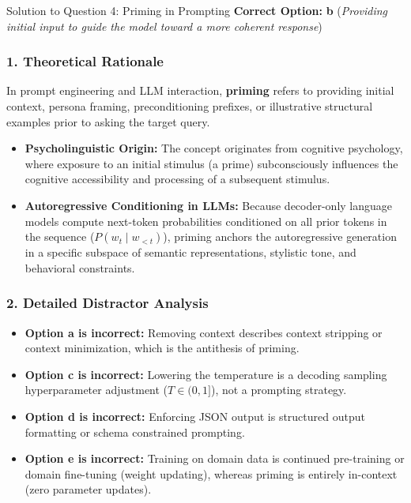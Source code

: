\documentclass[11pt,a4paper]{article}
\begin{document}
\begin{solutionbox}{Solution to Question 4: Priming in Prompting}
\textbf{Correct Option:} \textbf{b} (\textit{Providing initial input to guide the model toward a more coherent response})

\subsubsection*{1. Theoretical Rationale}
In prompt engineering and LLM interaction, \textbf{priming} refers to providing initial context, persona framing, preconditioning prefixes, or illustrative structural examples prior to asking the target query. 
\begin{itemize}[itemsep=2pt]
    \item \textbf{Psycholinguistic Origin:} The concept originates from cognitive psychology, where exposure to an initial stimulus (a prime) subconsciously influences the cognitive accessibility and processing of a subsequent stimulus.
    \item \textbf{Autoregressive Conditioning in LLMs:} Because decoder-only language models compute next-token probabilities conditioned on all prior tokens in the sequence ($P(w_t \mid w_{<t})$), priming anchors the autoregressive generation in a specific subspace of semantic representations, stylistic tone, and behavioral constraints.
\end{itemize}

\subsubsection*{2. Detailed Distractor Analysis}
\begin{itemize}[itemsep=2pt]
    \item \textbf{Option a is incorrect:} Removing context describes context stripping or context minimization, which is the antithesis of priming.
    \item \textbf{Option c is incorrect:} Lowering the temperature is a decoding sampling hyperparameter adjustment ($T \in (0, 1]$), not a prompting strategy.
    \item \textbf{Option d is incorrect:} Enforcing JSON output is structured output formatting or schema constrained prompting.
    \item \textbf{Option e is incorrect:} Training on domain data is continued pre-training or domain fine-tuning (weight updating), whereas priming is entirely in-context (zero parameter updates).
\end{itemize}
\end{solutionbox}
\end{document}
